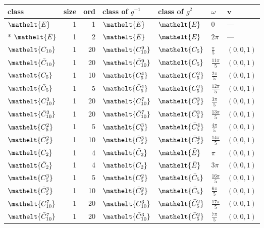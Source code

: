 \documentclass[10pt,a4paper]{article}
\numberwithin{equation}{section}
\newcommand{\eltfont}[1]{{\let\sigma\eltsigma\mathelt{#1}}}
\newcommand{\cls}[1]{\eltfont{#1}}
\newcommand{\dirvec}[3]{(#1, #2, #3)}
\newcommand{\vv}{\mathbf{v}}
\newcommand{\barred}[1]{\bar{#1}}
\begin{document}
{\renewcommand{\arraystretch}{1.3}\begin{longtable}{@{}lrrllll@{}}\toprule
class & size & ord & class of $g^{-1}$ & class of $g^{2}$ & $\omega$ & $\vv$\\\midrule\endhead
\bottomrule\endfoot\endlastfoot
$\cls{E}$ & 1 & 1 & $\cls{E}$ & $\cls{E}$ & $0$ & ---\\*
$\cls{\barred{E}}$ & 1 & 2 & $\cls{\barred{E}}$ & $\cls{E}$ & $2\pi$ & ---\\
$\cls{C_{10}}$ & 1 & 20 & $\cls{C_{10}^{9}}$ & $\cls{C_{5}}$ & $\tfrac{\pi}{5}$ & $\dirvec{0}{0}{1}$\\
$\cls{\barred{C}_{10}}$ & 1 & 20 & $\cls{\barred{C}_{10}^{9}}$ & $\cls{C_{5}}$ & $\tfrac{11\pi}{5}$ & $\dirvec{0}{0}{1}$\\
$\cls{C_{5}}$ & 1 & 10 & $\cls{C_{5}^{4}}$ & $\cls{C_{5}^{2}}$ & $\tfrac{2\pi}{5}$ & $\dirvec{0}{0}{1}$\\
$\cls{\barred{C}_{5}}$ & 1 & 5 & $\cls{\barred{C}_{5}^{4}}$ & $\cls{C_{5}^{2}}$ & $\tfrac{12\pi}{5}$ & $\dirvec{0}{0}{1}$\\
$\cls{C_{10}^{3}}$ & 1 & 20 & $\cls{C_{10}^{7}}$ & $\cls{\barred{C}_{5}^{3}}$ & $\tfrac{3\pi}{5}$ & $\dirvec{0}{0}{1}$\\
$\cls{\barred{C}_{10}^{3}}$ & 1 & 20 & $\cls{\barred{C}_{10}^{7}}$ & $\cls{\barred{C}_{5}^{3}}$ & $\tfrac{13\pi}{5}$ & $\dirvec{0}{0}{1}$\\
$\cls{C_{5}^{2}}$ & 1 & 5 & $\cls{C_{5}^{3}}$ & $\cls{\barred{C}_{5}^{4}}$ & $\tfrac{4\pi}{5}$ & $\dirvec{0}{0}{1}$\\
$\cls{\barred{C}_{5}^{2}}$ & 1 & 10 & $\cls{\barred{C}_{5}^{3}}$ & $\cls{\barred{C}_{5}^{4}}$ & $\tfrac{14\pi}{5}$ & $\dirvec{0}{0}{1}$\\
$\cls{C_{2}}$ & 1 & 4 & $\cls{\barred{C}_{2}}$ & $\cls{\barred{E}}$ & $\pi$ & $\dirvec{0}{0}{1}$\\
$\cls{\barred{C}_{2}}$ & 1 & 4 & $\cls{C_{2}}$ & $\cls{\barred{E}}$ & $3\pi$ & $\dirvec{0}{0}{1}$\\
$\cls{C_{5}^{3}}$ & 1 & 5 & $\cls{C_{5}^{2}}$ & $\cls{\barred{C}_{5}}$ & $\tfrac{16\pi}{5}$ & $\dirvec{0}{0}{1}$\\
$\cls{\barred{C}_{5}^{3}}$ & 1 & 10 & $\cls{\barred{C}_{5}^{2}}$ & $\cls{\barred{C}_{5}}$ & $\tfrac{6\pi}{5}$ & $\dirvec{0}{0}{1}$\\
$\cls{C_{10}^{7}}$ & 1 & 20 & $\cls{C_{10}^{3}}$ & $\cls{\barred{C}_{5}^{2}}$ & $\tfrac{17\pi}{5}$ & $\dirvec{0}{0}{1}$\\
$\cls{\barred{C}_{10}^{7}}$ & 1 & 20 & $\cls{\barred{C}_{10}^{3}}$ & $\cls{\barred{C}_{5}^{2}}$ & $\tfrac{7\pi}{5}$ & $\dirvec{0}{0}{1}$\\

\end{longtable}}
\end{document}

